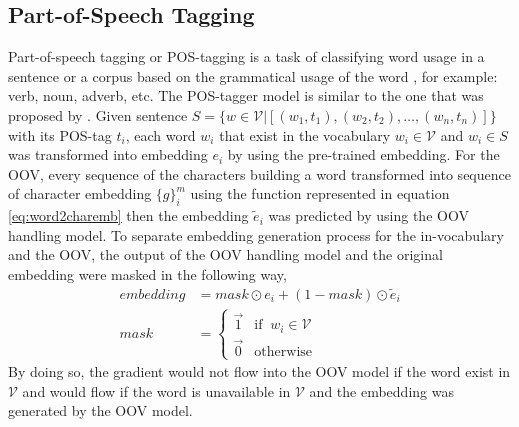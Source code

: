     \subsection{Part-of-Speech Tagging}
        Part-of-speech tagging or POS-tagging is a task of classifying
        word usage in a sentence or a corpus based on the grammatical
        usage of the word \citep{robustpostag2018horsmann}, for
        example: verb, noun, adverb, etc. The POS-tagger model is
        similar to the one that was proposed by
        \cite{finding2015ling}. Given sentence $S = \{w \in
        \mathcal{V} \vert [(w_1, t_1), (w_2, t_2), \dots, (w_n,
        t_n)]\}$ with its POS-tag $t_i$, each word $w_i$ that exist in
        the vocabulary $w_i \in \mathcal{V}$ and $w_i \in S$ was
        transformed into embedding $e_i$ by using the pre-trained
        embedding. For the OOV, every sequence of the characters
        building a word transformed into sequence of character
        embedding $\{g\}_{i}^m$ using the function represented in
        equation \ref{eq:word2charemb} then the embedding
        $\tilde{e}_i$ was predicted by using the OOV handling model.
        To separate embedding generation process for the in-vocabulary
        and the OOV, the output of the OOV handling model and the
        original embedding were masked in the following way,
        \begin{align}
            \label{eq:embeddingmask}
            embedding &= mask \odot e_i + (1-mask) \odot \tilde{e}_i\\
            mask &=
            \begin{cases}
                \vec{1} & \text{if }\ w_i \in \mathcal{V}\\
                \vec{0} & \text{otherwise}
            \end{cases}
        \end{align}        
        By doing so, the gradient would not flow into the OOV model if
        the word exist in $\mathcal{V}$ and would flow if the word is
        unavailable in $\mathcal{V}$ and the embedding was generated
        by the OOV model.

